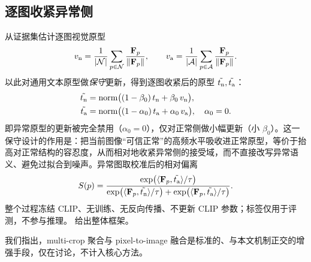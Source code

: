 \subsection{逐图收紧异常侧}
从证据集估计逐图视觉原型
\begin{equation}
\label{eq:proto}
v_{\mathrm{n}}=\frac{1}{|\mathcal{N}|}\sum_{p\in\mathcal{N}}\frac{\mathbf{F}_p}{\lVert\mathbf{F}_p\rVert},\qquad
v_{\mathrm{a}}=\frac{1}{|\mathcal{A}|}\sum_{p\in\mathcal{A}}\frac{\mathbf{F}_p}{\lVert\mathbf{F}_p\rVert}.
\end{equation}
以此对通用文本原型做\emph{保守}更新，得到逐图收紧后的原型 $\tilde{t_{\mathrm{n}}},\tilde{t_{\mathrm{a}}}$：
\begin{align}
\label{eq:update-n}
\tilde{t_{\mathrm{n}}}&=\mathrm{norm}\big((1-\beta_0)\,t_{\mathrm{n}}+\beta_0\,v_{\mathrm{n}}\big),\\
\label{eq:update-a}
\tilde{t_{\mathrm{a}}}&=\mathrm{norm}\big((1-\alpha_0)\,t_{\mathrm{a}}+\alpha_0\,v_{\mathrm{a}}\big),\quad \alpha_0=0.
\end{align}
即异常原型的更新被完全禁用（$\alpha_0=0$），仅对正常侧做小幅更新（小 $\beta_0$）。这一保守设计的作用是：把当前图像“可信正常”的高频水平吸收进正常原型，等价于抬高对正常结构的容忍度，从而相对地收紧异常侧的接受域，而不直接改写异常语义、避免过拟合到噪声。异常图取校准后的相对偏离
\begin{equation}
\label{eq:final}
S(p)=\frac{\exp\!\big(\langle \mathbf{F}_p,\tilde{t_{\mathrm{a}}}\rangle/\tau\big)}
{\exp\!\big(\langle \mathbf{F}_p,\tilde{t_{\mathrm{n}}}\rangle/\tau\big)+\exp\!\big(\langle \mathbf{F}_p,\tilde{t_{\mathrm{a}}}\rangle/\tau\big)}.
\end{equation}
整个过程冻结 CLIP、无训练、无反向传播、不更新 CLIP 参数；标签仅用于评测，不参与推理。 给出整体框架。



我们指出，multi-crop 聚合与 pixel-to-image 融合是标准的、与本文机制正交的增强手段，仅在讨论，不计入核心方法。
